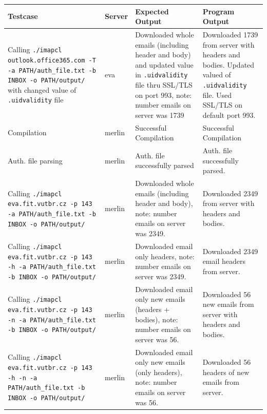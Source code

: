 \documentclass[a4paper,11pt]{article}
\begin{document}
\begin{center}
    \vspace{0.5cm} %
    \begin{tabularx}{\textwidth}{|>{\raggedright\arraybackslash}p{5cm}|>{\raggedright\arraybackslash}p{1cm}|>{\raggedright\arraybackslash}p{5cm}|>{\raggedright\arraybackslash}X|}
        \hline
        \textbf{Testcase} & \textbf{Server} & \textbf{Expected Output} & \textbf{Program Output} \\
        \hline
        Calling \texttt{./imapcl outlook.office365.com -T -a PATH/auth\_file.txt -b INBOX -o PATH/output/} with changed value of \texttt{.uidvalidity} file & eva & Downloaded whole emails (including header and body) and updated value in \texttt{.uidvalidity} file thru SSL/TLS on port 993, note: number emails on server was 1739 & Downloaded 1739 from server with headers and bodies. Updated valued of \texttt{.uidvalidity} file. Used SSL/TLS on default port 993.\\
        \hline
        Compilation & merlin & Successful Compilation & Successful Compilation \\
        \hline
        Auth. file parsing & merlin & Auth. file successfully parsed & Auth. file successfully parsed. \\
        \hline
        Calling \texttt{./imapcl eva.fit.vutbr.cz -p 143 -a PATH/auth\_file.txt -b INBOX -o PATH/output/} & merlin & Downloaded whole emails (including header and body), note: number emails on server was 2349. & Downloaded 2349 from server with headers and bodies. \\
        \hline
        Calling \texttt{./imapcl eva.fit.vutbr.cz -p 143 -h -a PATH/auth\_file.txt -b INBOX -o PATH/output/} & merlin & Downloaded email only headers, note: number emails on server was 2349. & Downloaded 2349 email headers from server. \\
        \hline
        Calling \texttt{./imapcl eva.fit.vutbr.cz -p 143 -n -a PATH/auth\_file.txt -b INBOX -o PATH/output/} & merlin & Downloaded email only new emails (headers + bodies), note: number emails on server was 56. & Downloaded 56 new emails from server with headers and bodies. \\
        \hline
        Calling \texttt{./imapcl eva.fit.vutbr.cz -p 143 -h -n -a PATH/auth\_file.txt -b INBOX -o PATH/output/} & merlin & Downloaded email only new emails (only headers), note: number emails on server was 56. & Downloaded 56 headers of new emails from server. \\
        \hline

\end{tabularx}
\end{center}
\end{document}
